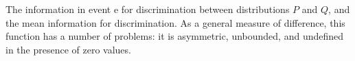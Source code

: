 

The information in event e for discrimination between distributions $P$ and $Q$, and the mean information for discrimination.
As a general measure of difference, this function has a number of problems: it is asymmetric, unbounded, and undefined in the presence of zero values.





